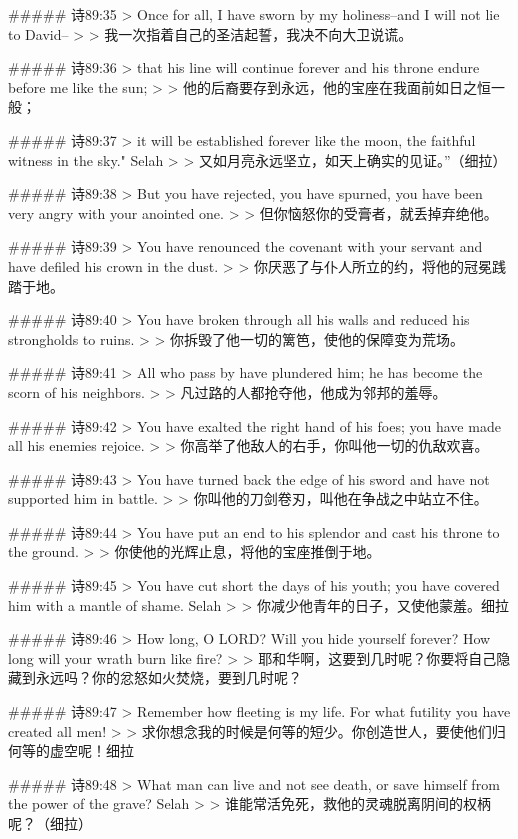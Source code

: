 ##### 诗89:35
> Once for all, I have sworn by my holiness--and I will not lie to David--
>
> 我一次指着自己的圣洁起誓，我决不向大卫说谎。


##### 诗89:36
> that his line will continue forever and his throne endure before me like the sun;
>
> 他的后裔要存到永远，他的宝座在我面前如日之恒一般；


##### 诗89:37
> it will be established forever like the moon, the faithful witness in the sky." Selah
>
> 又如月亮永远坚立，如天上确实的见证。”（细拉）


##### 诗89:38
> But you have rejected, you have spurned, you have been very angry with your anointed one.
>
> 但你恼怒你的受膏者，就丢掉弃绝他。


##### 诗89:39
> You have renounced the covenant with your servant and have defiled his crown in the dust.
>
> 你厌恶了与仆人所立的约，将他的冠冕践踏于地。


##### 诗89:40
> You have broken through all his walls and reduced his strongholds to ruins.
>
> 你拆毁了他一切的篱笆，使他的保障变为荒场。


##### 诗89:41
> All who pass by have plundered him; he has become the scorn of his neighbors.
>
> 凡过路的人都抢夺他，他成为邻邦的羞辱。


##### 诗89:42
> You have exalted the right hand of his foes; you have made all his enemies rejoice.
>
> 你高举了他敌人的右手，你叫他一切的仇敌欢喜。


##### 诗89:43
> You have turned back the edge of his sword and have not supported him in battle.
>
> 你叫他的刀剑卷刃，叫他在争战之中站立不住。


##### 诗89:44
> You have put an end to his splendor and cast his throne to the ground.
>
> 你使他的光辉止息，将他的宝座推倒于地。


##### 诗89:45
> You have cut short the days of his youth; you have covered him with a mantle of shame. Selah
>
> 你减少他青年的日子，又使他蒙羞。细拉


##### 诗89:46
> How long, O LORD? Will you hide yourself forever? How long will your wrath burn like fire?
>
> 耶和华啊，这要到几时呢？你要将自己隐藏到永远吗？你的忿怒如火焚烧，要到几时呢？


##### 诗89:47
> Remember how fleeting is my life. For what futility you have created all men!
>
> 求你想念我的时候是何等的短少。你创造世人，要使他们归何等的虚空呢！细拉


##### 诗89:48
> What man can live and not see death, or save himself from the power of the grave? Selah
>
> 谁能常活免死，救他的灵魂脱离阴间的权柄呢？（细拉）


